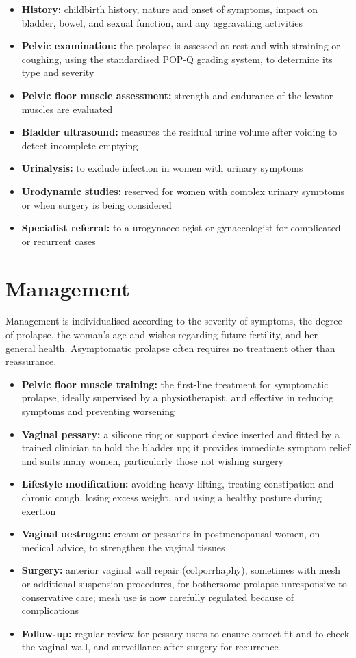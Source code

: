 \begin{itemize}
    \item \textbf{History:} childbirth history, nature and onset of symptoms, impact on bladder, bowel, and sexual function, and any aggravating activities
    \item \textbf{Pelvic examination:} the prolapse is assessed at rest and with straining or coughing, using the standardised POP-Q grading system, to determine its type and severity
    \item \textbf{Pelvic floor muscle assessment:} strength and endurance of the levator muscles are evaluated
    \item \textbf{Bladder ultrasound:} measures the residual urine volume after voiding to detect incomplete emptying
    \item \textbf{Urinalysis:} to exclude infection in women with urinary symptoms
    \item \textbf{Urodynamic studies:} reserved for women with complex urinary symptoms or when surgery is being considered
    \item \textbf{Specialist referral:} to a urogynaecologist or gynaecologist for complicated or recurrent cases
\end{itemize}

\section*{Management}
Management is individualised according to the severity of symptoms, the degree of prolapse, the woman's age and wishes regarding future fertility, and her general health. Asymptomatic prolapse often requires no treatment other than reassurance.

\begin{itemize}
    \item \textbf{Pelvic floor muscle training:} the first-line treatment for symptomatic prolapse, ideally supervised by a physiotherapist, and effective in reducing symptoms and preventing worsening
    \item \textbf{Vaginal pessary:} a silicone ring or support device inserted and fitted by a trained clinician to hold the bladder up; it provides immediate symptom relief and suits many women, particularly those not wishing surgery
    \item \textbf{Lifestyle modification:} avoiding heavy lifting, treating constipation and chronic cough, losing excess weight, and using a healthy posture during exertion
    \item \textbf{Vaginal oestrogen:} cream or pessaries in postmenopausal women, on medical advice, to strengthen the vaginal tissues
    \item \textbf{Surgery:} anterior vaginal wall repair (colporrhaphy), sometimes with mesh or additional suspension procedures, for bothersome prolapse unresponsive to conservative care; mesh use is now carefully regulated because of complications
    \item \textbf{Follow-up:} regular review for pessary users to ensure correct fit and to check the vaginal wall, and surveillance after surgery for recurrence
\end{itemize}

